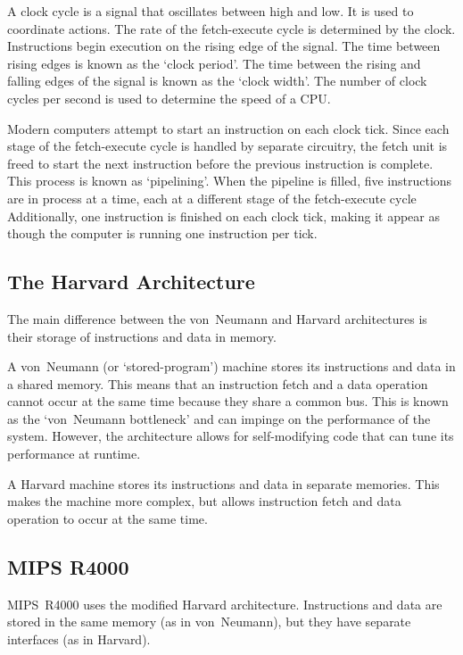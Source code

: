 A clock cycle is a signal that oscillates between high and low.
It is used to coordinate actions.
The rate of the fetch-execute cycle is determined by the clock.
Instructions begin execution on the rising edge of the signal.
The time between rising edges is known as the `clock period'.
The time between the rising and falling edges of the signal is known as the `clock width'.
The number of clock cycles per second is used to determine the speed of a CPU.

Modern computers attempt to start an instruction on each clock tick.
Since each stage of the fetch-execute cycle is handled by separate circuitry, the fetch unit is freed to start the next instruction before the previous instruction is complete.
This process is known as `pipelining'.
When the pipeline is filled, five instructions are in process at a time, each at a different stage of the fetch-execute cycle
Additionally, one instruction is finished on each clock tick, making it appear as though the computer is running one instruction per tick.

\subsection{The Harvard Architecture}

The main difference between the von~Neumann and Harvard architectures is their storage of instructions and data in memory.

A von~Neumann (or `stored-program') machine stores its instructions and data in a shared memory.
This means that an instruction fetch and a data operation cannot occur at the same time because they share a common bus.
This is known as the `von~Neumann bottleneck' and can impinge on the performance of the system.
However, the architecture allows for self-modifying code that can tune its performance at runtime.

A Harvard machine stores its instructions and data in separate memories.
This makes the machine more complex, but allows instruction fetch and data operation to occur at the same time.

\subsection{MIPS R4000}

MIPS~R4000 uses the modified Harvard architecture.
Instructions and data are stored in the same memory (as in von~Neumann), but they have separate interfaces (as in Harvard).

